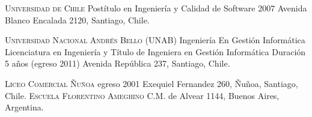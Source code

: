 \documentclass[11pt,letterpaper,roman]{moderncv}
\begin{document}
	{\textsc{Universidad de Chile}}
	{Postítulo en Ingeniería y Calidad de Software}
	{2007}
	{}
	{Avenida Blanco Encalada 2120, Santiago, Chile.}
	
	{\textsc{Universidad Nacional Andrés Bello (UNAB)}}
	{Ingeniería En Gestión Informática}
	{Licenciatura en Ingeniería y Título de Ingeniera en Gestión Informática}
	{Duración 5 años (egreso 2011)}
	{Avenida República 237, Santiago, Chile.}


	{\textsc{Liceo Comercial Ñuñoa}}
	{egreso 2001}
	{}
	{}
	{Exequiel Fernandez 260, Ñuñoa, Santiago, Chile.}
	{\textsc{Escuela Florentino Ameghino}}
	{}
	{}
	{}
	{C.M. de Alvear 1144, Buenos Aires, Argentina.}
\end{document}
